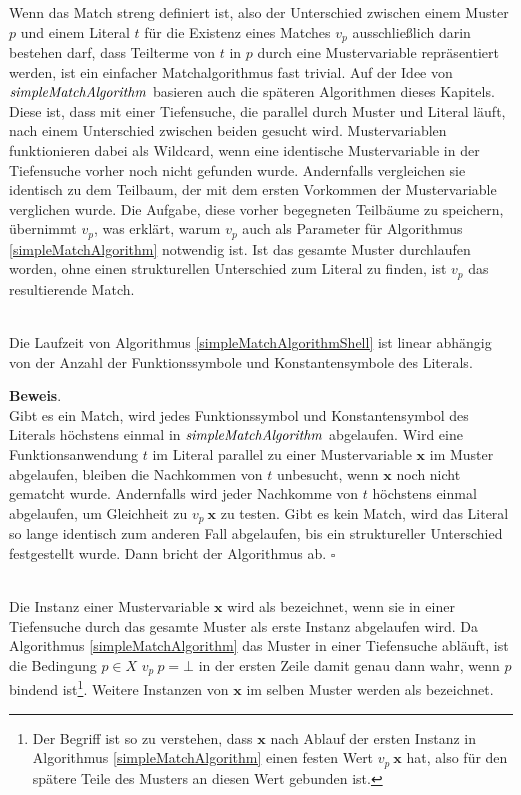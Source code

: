 Wenn das Match streng definiert ist, also der Unterschied zwischen einem Muster $p$ und einem Literal $t$ für die Existenz eines Matches $v_p$ ausschließlich darin bestehen darf, dass Teilterme von $t$ in $p$ durch eine Mustervariable repräsentiert werden, ist ein einfacher Matchalgorithmus fast trivial. Auf der Idee von $\mathit{simpleMatchAlgorithm}$ basieren auch die späteren Algorithmen dieses Kapitels. Diese ist, dass mit einer Tiefensuche, die parallel durch Muster und Literal läuft, nach einem Unterschied zwischen beiden gesucht wird. Mustervariablen funktionieren dabei als Wildcard, wenn eine identische Mustervariable in der Tiefensuche vorher noch nicht gefunden wurde. Andernfalls vergleichen sie identisch zu dem Teilbaum, der mit dem ersten Vorkommen der Mustervariable verglichen wurde. Die Aufgabe, diese vorher begegneten Teilbäume zu speichern, übernimmt $v_p$, was erklärt, warum $v_p$ auch als Parameter für Algorithmus \ref{simpleMatchAlgorithm} notwendig ist. Ist das gesamte Muster durchlaufen worden, ohne einen strukturellen Unterschied zum Literal zu finden, ist $v_p$ das resultierende Match.\\

\begin{lemma}~\\
Die Laufzeit von Algorithmus \ref{simpleMatchAlgorithmShell} ist linear abhängig von der Anzahl der Funktionssymbole und Konstantensymbole des Literals.
\end{lemma}

\textbf{Beweis}.\\
Gibt es ein Match, wird jedes Funktionssymbol und Konstantensymbol des Literals höchstens einmal in $\mathit{simpleMatchAlgorithm}$ abgelaufen. Wird eine Funktionsanwendung $t$ im Literal parallel zu einer Mustervariable $\mathbf x$ im Muster abgelaufen, bleiben die Nachkommen von $t$ unbesucht, wenn $\mathbf x$ noch nicht gematcht wurde. Andernfalls wird jeder Nachkomme von $t$ höchstens einmal abgelaufen, um Gleichheit zu $v_p~\mathbf x$ zu testen.
Gibt es kein Match, wird das Literal so lange identisch zum anderen Fall abgelaufen, bis ein struktureller Unterschied festgestellt wurde. Dann bricht der Algorithmus ab.
\hfill $\square$\\


\begin{definition}~\\
Die Instanz einer Mustervariable $\mathbf x$ wird als   bezeichnet, wenn sie in einer Tiefensuche durch das gesamte Muster als erste Instanz abgelaufen wird. Da Algorithmus \ref{simpleMatchAlgorithm} das Muster in einer Tiefensuche abläuft, ist die Bedingung $p \in X$ \KwAnd $v_p~p = \bot$ in der ersten Zeile damit genau dann wahr, wenn $p$ bindend ist\footnote{Der Begriff  ist so zu verstehen, dass $\mathbf x$ nach Ablauf der ersten Instanz in Algorithmus \ref{simpleMatchAlgorithm} einen festen Wert $v_p~\mathbf x$ hat, also für den spätere Teile des Musters an diesen Wert gebunden ist.}. Weitere Instanzen von $\mathbf x$ im selben Muster werden als  bezeichnet.
\end{definition}



